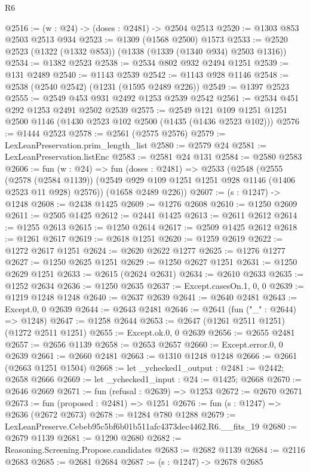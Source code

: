 \begin{lexlean}{R6}
\begin{coremodule}
@2516 := (w : @24) -> (doses : @2481) -> @2504 @2513
@2520 := @1303 @853 @2503 @2513 @934
@2523 := @1309 (@1568 @2500) @1573
@2533 := @2520 @2523 (@1322 (@1332 @853)) (@1338 (@1339 (@1340 @934) @2503 @1316))
@2534 := @1382 @2523
@2538 := @2534 @802 @932 @2494 @1251
@2539 := @131 @2489
@2540 := @1143 @2539
@2542 := @1143 @928 @1146
@2548 := @2538 (@2540 @2542) (@1231 (@1595 @2489 @226))
@2549 := @1397 @2523
@2555 := @2549 @453 @931 @2492 @1253 @2539 @2542
@2561 := @2534 @451 @292 @1253 @2491 @2502 @2539
@2575 := @2549 @121 @109 @1251 @1251 @2500 @1146 (@1430 @2523 @102 @2500 (@1435 (@1436 @2523 @102)))
@2576 := @1444 @2523
@2578 := @2561 (@2575 @2576)
@2579 := LexLeanPreservation.prim_length_list
@2580 := @2579 @24
@2581 := LexLeanPreservation.listEnc
@2583 := @2581 @24 @131
@2584 := @2580 @2583
@2606 := fun (w : @24) =>
  fun (doses : @2481) =>
  @2533
    (@2548
      (@2555
        (@2578 (@2584 @1139))
        (@2549 @929 @109 @1251 @1251 @928 @1146 (@1406 @2523 @11 @928) @2576))
      (@1658 @2489 @226))
@2607 := (s : @1247) -> @1248
@2608 := @2438 @1425
@2609 := @1276 @2608
@2610 := @1250 @2609
@2611 := @2505 @1425
@2612 := @2441 @1425
@2613 := @2611 @2612
@2614 := @1255 @2613
@2615 := @1250 @2614
@2617 := @2509 @1425 @2612
@2618 := @1261 @2617
@2619 := @2618 @1251
@2620 := @1259 @2619
@2622 := @1272 @2617 @1251
@2624 := @2620 @2622 @1277
@2625 := @1276 @1277
@2627 := @1250 @2625 @1251
@2629 := @1250 @2627 @1251
@2631 := @1250 @2629 @1251
@2633 := @2615 (@2624 @2631)
@2634 := @2610 @2633
@2635 := @1252 @2634
@2636 := @1250 @2635
@2637 := Except.casesOn.{1, 0, 0}
@2639 := @1219 @1248 @1248
@2640 := @2637 @2639
@2641 := @2640 @2481
@2643 := Except.{0, 0} @2639
@2644 := @2643 @2481
@2646 := @2641 (fun ("_" : @2644) => @1248)
@2647 := @1258 @2644
@2653 := @2647 (@1261 @2511 @1251) (@1272 @2511 @1251)
@2655 := Except.ok.{0, 0} @2639
@2656 := @2655 @2481
@2657 := @2656 @1139
@2658 := @2653 @2657
@2660 := Except.error.{0, 0} @2639
@2661 := @2660 @2481
@2663 := @1310 @1248 @1248
@2666 := @2661 (@2663 @1251 @1504)
@2668 := let _ychecked1_output : @2481 := @2442; @2658 @2666
@2669 := let _ychecked1_input : @24 := @1425; @2668
@2670 := @2646 @2669
@2671 := fun (refusal : @2639) => @1253
@2672 := @2670 @2671
@2673 := fun (proposed : @2481) => @1251
@2676 := fun (s : @1247) => @2636 (@2672 @2673)
@2678 := @1284 @780 @1288
@2679 := LexLeanPreserve.Cebeb95c5bf6b01b511afc4373dec4462.R6.__fits_19
@2680 := @2679 @1139
@2681 := @1290 @2680
@2682 := Reasoning.Screening.Propose.candidates
@2683 := @2682 @1139
@2684 := @2116 @2683
@2685 := @2681 @2684
@2687 := (s : @1247) -> @2678 @2685

\end{coremodule}
\end{lexlean}
